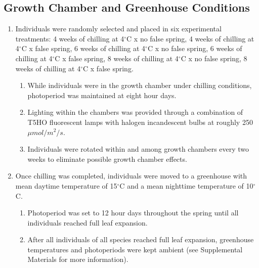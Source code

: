 \documentclass{article}\usepackage[]{graphicx}\usepackage[]{color}
\begin{document}
\subsection*{Growth Chamber and Greenhouse Conditions}
\begin{enumerate}
\item Individuals were randomly selected and placed in six experimental treatments: 4 weeks of chilling at 4$^{\circ}$C x no false spring, 4 weeks of chilling at 4$^{\circ}$C x false spring, 6 weeks of chilling at 4$^{\circ}$C x no false spring, 6 weeks of chilling at 4$^{\circ}$C x false spring,
8 weeks of chilling at 4$^{\circ}$C x no false spring, 8 weeks of chilling at 4$^{\circ}$C x false spring.
  \begin{enumerate}
  \item While individuals were in the growth chamber under chilling conditions, photoperiod was maintained at eight hour days.
  \item Lighting within the chambers was provided through a combination of T5HO fluorescent lamps with halogen incandescent bulbs at roughly 250 $\mu mol/m^{2}/s$.
  \item Individuals were rotated within and among growth chambers every two weeks to eliminate possible growth chamber effects.
  \end{enumerate}
\item Once chilling was completed, individuals were moved to a greenhouse with mean daytime temperature of 15$^{\circ}$C and a mean nighttime temperature of 10$^{\circ}$C.
  \begin{enumerate}
  \item Photoperiod was set to 12 hour days throughout the spring until all individuals reached full leaf expansion.
  \item After all individuals of all species reached full leaf expansion, greenhouse temperatures and photoperiods were kept ambient (see Supplemental Materials for more information). 
  \end{enumerate}
\end{enumerate}
\end{document}
